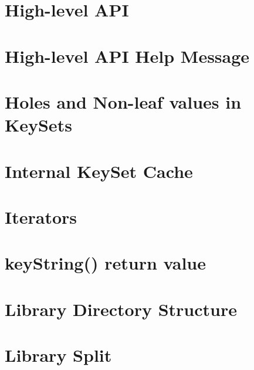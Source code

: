 \let\mypdfximage\pdfximage\def\pdfximage{\immediate\mypdfximage}\documentclass[twoside]{book}
\newcommand{\+}{\discretionary{\mbox{\scriptsize$\hookleftarrow$}}{}{}}
\begin{document}
\chapter{High-\/level API}
\label{doc_decisions_high_level_api_md}

\chapter{High-\/level API Help Message}
\label{doc_decisions_highlevel_help_message_md}

\chapter{Holes and Non-\/leaf values in Key\+Sets}
\label{doc_decisions_holes_md}

\chapter{Internal Key\+Set Cache}
\label{doc_decisions_internal_cache_md}

\chapter{Iterators}
\label{doc_decisions_iterators_md}

\chapter{key\+String() return value}
\label{doc_decisions_key_string_return_value_md}

\chapter{Library Directory Structure}
\label{doc_decisions_library_directory_structure_md}

\chapter{Library Split}
\label{doc_decisions_library_split_md}

\end{document}
